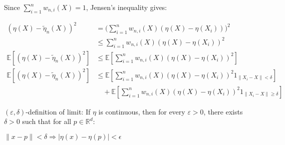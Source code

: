 \documentclass[12pt]{article}
\begin{document}
\begin{enumerate}
Since $\sum_{i=1}^n w_{n,i}(X) = 1$, Jensen's inequality gives:

\begin{align*}
(\eta(X) - \tilde{\eta}_n(X))^2 &= \Big(\sum_{i=1}^n w_{n,i}(X)(\eta(X) - \eta(X_i))\Big)^2\\
&\leq \sum_{i=1}^n w_{n,i}(X)(\eta(X) - \eta(X_i))^2\\
\mathbb{E}[(\eta(X) - \tilde{\eta}_n(X))^2] &\leq \mathbb{E}[\sum_{i=1}^n w_{n,i}(X)(\eta(X) - \eta(X_i))^2]
\\
\mathbb{E}[(\eta(X) - \tilde{\eta}_n(X))^2] &\leq \mathbb{E}[\sum_{i=1}^n w_{n,i}(X)(\eta(X) - \eta(X_i))^2 1_{\|X_i - X\| < \delta}]\\
&\quad + \mathbb{E}[\sum_{i=1}^n w_{n,i}(X)(\eta(X) - \eta(X_i))^2 1_{\|X_i - X\| \geq \delta}]
\end{align*}

$(\varepsilon, \delta)$-definition of limit: If $\eta$ is continuous, then for every $\varepsilon > 0$, there exists $\delta > 0$ such that for all $p \in \mathbb{R}^d$:

$\|x - p\| < \delta \Rightarrow |\eta(x) - \eta(p)| < \epsilon$\\

\end{enumerate}
\end{document}
